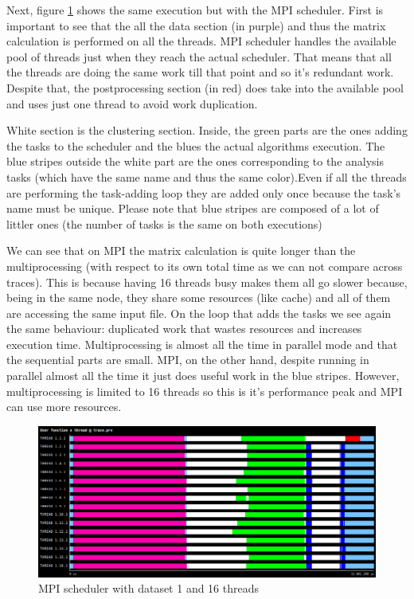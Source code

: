 Next, figure \ref{tra:mpi16small} shows the same execution but with the MPI scheduler. First is important to see that the all the data section (in purple) and thus the matrix calculation is performed on all the threads. MPI scheduler handles the available pool of threads just when they reach the actual scheduler. That means that all the threads are doing the same work till that point and so it's redundant work. Despite that, the postprocessing section (in red) does take into the available pool and uses just one thread to avoid work duplication. 

White section is the clustering section. Inside, the green parts are the ones adding the tasks to the scheduler and the blues the actual algorithms execution. The blue stripes outside the white part are the ones corresponding to the analysis tasks (which have the same name and thus the same color).Even if all the threads are performing the task-adding loop they are added only once because the task's name must be unique. Please note that blue stripes are composed of a lot of littler ones (the number of tasks is the same on both executions)  

We can see that on MPI the matrix calculation is quite longer than the multiprocessing (with respect to its own total time as we can not compare across traces). This is because having 16 threads busy makes them all go slower because, being in the same node, they share some resources (like cache) and all of them are accessing the same input file. On the loop that adds the tasks we see again the same behaviour: duplicated work that wastes resources and increases execution time. Multiprocessing is almost all the time in parallel mode and that the sequential parts are small. MPI, on the other hand, despite running in parallel almost all the time it just does useful work in the blue stripes. However, multiprocessing is limited to 16 threads so this is it's performance peak and MPI can use more resources.

\begin{figure}[h]
\includegraphics[width=\textwidth]{traces/mpi_16_small.png}
\caption{MPI scheduler with dataset 1 and 16 threads}
\label{tra:mpi16small}
\end{figure}

